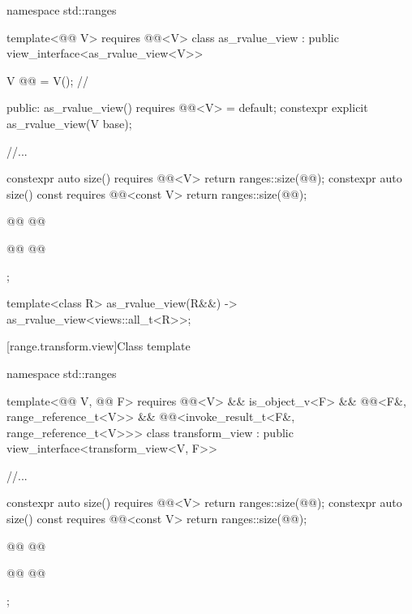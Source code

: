 \documentclass{wg21}
\begin{document}
\begin{codeblock}
namespace std::ranges {
template<@@ V>
requires @@<V>
class as_rvalue_view : public view_interface<as_rvalue_view<V>> {
    V @@ = V();      // \expos

    public:
    as_rvalue_view() requires @@<V> = default;
    constexpr explicit as_rvalue_view(V base);

    //...

    constexpr auto size() requires @@<V> { return ranges::size(@@); }
    constexpr auto size() const requires @@<const V> { return ranges::size(@@); }

    @@
    @@

    @@
    @@
};

template<class R>
as_rvalue_view(R&&) -> as_rvalue_view<views::all_t<R>>;
}
\end{codeblock}

[range.transform.view]{Class template }

%
%
%
\begin{codeblock}
namespace std::ranges {
template<@@ V, @@ F>
requires @@<V> && is_object_v<F> &&
@@<F&, range_reference_t<V>> &&
@@<invoke_result_t<F&, range_reference_t<V>>>
class transform_view : public view_interface<transform_view<V, F>> {
    //...

    constexpr auto size() requires @@<V> { return ranges::size(@@); }
    constexpr auto size() const requires @@<const V>
    { return ranges::size(@@); }

    @@
    @@

    @@
    @@
};

}
\end{codeblock}
\end{document}
